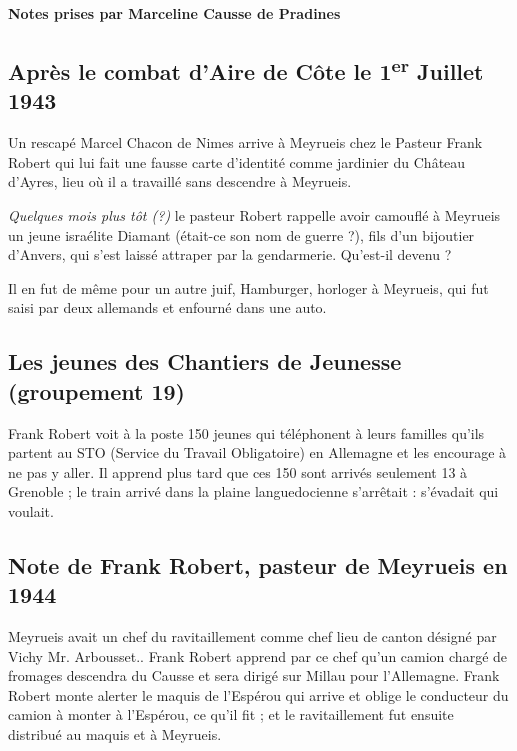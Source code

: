 

\begin{center}
\vspace{0.5em}
{\bfseries Notes prises par Marceline Causse de Pradines}
\end{center}

\medskip

\subsection{Après le combat d’Aire de Côte le 1\textsuperscript{er} Juillet 1943}

Un rescapé Marcel Chacon de Nimes arrive à Meyrueis chez le Pasteur Frank Robert qui lui
fait une fausse carte d’identité comme jardinier du Château d’Ayres, lieu où il a travaillé sans
descendre à Meyrueis.

\medskip

\noindent\textit{Quelques mois plus tôt (?) } le pasteur Robert rappelle avoir camouflé à Meyrueis un jeune
israélite Diamant (était-ce son nom de guerre ?), fils d’un bijoutier d’Anvers, qui s’est laissé
attraper par la gendarmerie. Qu’est-il devenu ?

Il en fut de même pour un autre juif, Hamburger, horloger à Meyrueis, qui fut saisi par deux
allemands et enfourné dans une auto.

\medskip

\subsection{Les jeunes des Chantiers de Jeunesse (groupement 19)}

Frank Robert voit à la poste 150 jeunes qui téléphonent à leurs familles qu’ils partent au STO
(Service du Travail Obligatoire) en Allemagne et les encourage à ne pas y aller. Il apprend
plus tard que ces 150 sont arrivés seulement 13 à Grenoble ; le train arrivé dans la plaine
languedocienne s’arrêtait : s’évadait qui voulait.

\medskip

\subsection{Note de Frank Robert, pasteur de Meyrueis en 1944}

Meyrueis avait un chef du ravitaillement comme chef lieu de canton désigné par Vichy
Mr. Arbousset.. Frank Robert apprend par ce chef qu’un camion chargé de fromages
descendra du Causse et sera dirigé sur Millau pour l’Allemagne. Frank Robert monte alerter le
maquis de l’Espérou qui arrive et oblige le conducteur du camion à monter à l’Espérou, ce
qu’il fit ; et le ravitaillement fut ensuite distribué au maquis et à Meyrueis.

